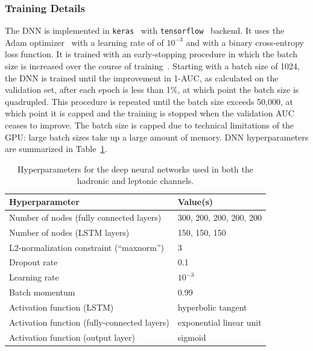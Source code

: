 \subsubsection{Training Details}
The DNN is implemented in \texttt{keras}~\cite{keras} with \texttt{tensorflow}~\cite{tensorflow} backend.
It uses the Adam optimizer~\cite{adam} with a learning rate of of $10^{-3}$ and with a binary cross-entropy loss function.
It is trained with an early-stopping procedure in which the batch size is increased over the course of training~\cite{increase_batch}.
Starting with a batch size of 1024, the DNN is trained until the improvement in 1-AUC, as calculated on the validation set, after each epoch is less than 1\%, at which point the batch size is quadrupled.
This procedure is repeated until the batch size exceeds 50,000, at which point it is capped and the training is stopped when the validation AUC ceases to improve.
The batch size is capped due to technical limitations of the GPU: large batch sizes take up a large amount of memory.
DNN hyperparameters are summarized in Table~\ref{tab:tth_dnn_hyperparams}.

\begin{table} [h]
    \centering
    \caption{Hyperparameters for the deep neural networks used in both the hadronic and leptonic channels.}
    \begin{tabular}{l l}
        Hyperparameter & Value(s) \\ \hline
        Number of nodes (fully connected layers) & 300, 200, 200, 200, 200 \\
        Number of nodes (LSTM layers) & 150, 150, 150 \\
        L2-normalization constraint (``maxnorm'') & 3 \\
        Dropout rate & 0.1 \\
        Learning rate & $10^{-3}$ \\
        Batch momentum & 0.99 \\
        Activation function (LSTM) & hyperbolic tangent \\
        Activation function (fully-connected layers) & exponential linear unit \\
        Activation function (output layer) & sigmoid \\
    \end{tabular}
    \label{tab:tth_dnn_hyperparams}
\end{table}

